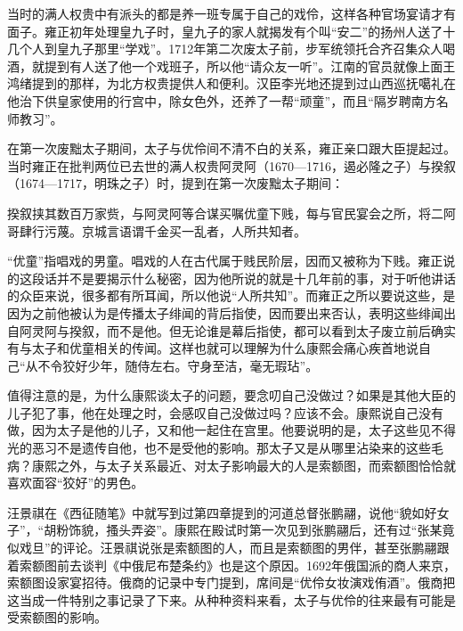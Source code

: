
当时的满人权贵中有派头的都是养一班专属于自己的戏伶，这样各种官场宴请才有面子。雍正初年处理皇九子时，皇九子的家人就揭发有个叫“安二”的扬州人送了十几个人到皇九子那里“学戏”。1712年第二次废太子前，步军统领托合齐召集众人喝酒，就提到有人送了他一个戏班子，所以他“请众友一听”。江南的官员就像上面王鸿绪提到的那样，为北方权贵提供人和便利。汉臣李光地还提到过山西巡抚噶礼在他治下供皇家使用的行宫中，除女色外，还养了一帮“顽童”，而且“隔岁聘南方名师教习”。



在第一次废黜太子期间，太子与优伶间不清不白的关系，雍正亲口跟大臣提起过。当时雍正在批判两位已去世的满人权贵阿灵阿（1670—1716，遏必隆之子）与揆叙（1674—1717，明珠之子）时，提到在第一次废黜太子期间：



\begin{bookquote}揆叙挟其数百万家赀，与阿灵阿等合谋买嘱优童下贱，每与官民宴会之所，将二阿哥肆行污蔑。京城言语谓千金买一乱者，人所共知者。\end{bookquote}


“优童”指唱戏的男童。唱戏的人在古代属于贱民阶层，因而又被称为下贱。雍正说的这段话并不是要揭示什么秘密，因为他所说的就是十几年前的事，对于听他讲话的众臣来说，很多都有所耳闻，所以他说“人所共知”。而雍正之所以要说这些，是因为之前他被认为是传播太子绯闻的背后指使，因而要出来否认，表明这些绯闻出自阿灵阿与揆叙，而不是他。但无论谁是幕后指使，都可以看到太子废立前后确实有与太子和优童相关的传闻。这样也就可以理解为什么康熙会痛心疾首地说自己“从不令狡好少年，随侍左右。守身至洁，毫无瑕玷”。



值得注意的是，为什么康熙谈太子的问题，要念叨自己没做过？如果是其他大臣的儿子犯了事，他在处理之时，会感叹自己没做过吗？应该不会。康熙说自己没有做，因为太子是他的儿子，又和他一起住在宫里。他要说明的是，太子这些见不得光的恶习不是遗传自他，也不是受他的影响。那太子又是从哪里沾染来的这些毛病？康熙之外，与太子关系最近、对太子影响最大的人是索额图，而索额图恰恰就喜欢面容“狡好”的男色。



汪景祺在《西征随笔》中就写到过第四章提到的河道总督张鹏翮，说他“貌如好女子”，“胡粉饰貌，搔头弄姿”。康熙在殿试时第一次见到张鹏翮后，还有过“张某竟似戏旦”的评论。汪景祺说张是索额图的人，而且是索额图的男伴，甚至张鹏翮跟着索额图前去谈判《中俄尼布楚条约》也是这个原因。1692年俄国派的商人来京，索额图设家宴招待。俄商的记录中专门提到，席间是“优伶女妆演戏侑酒”。俄商把这当成一件特别之事记录了下来。从种种资料来看，太子与优伶的往来最有可能是受索额图的影响。


